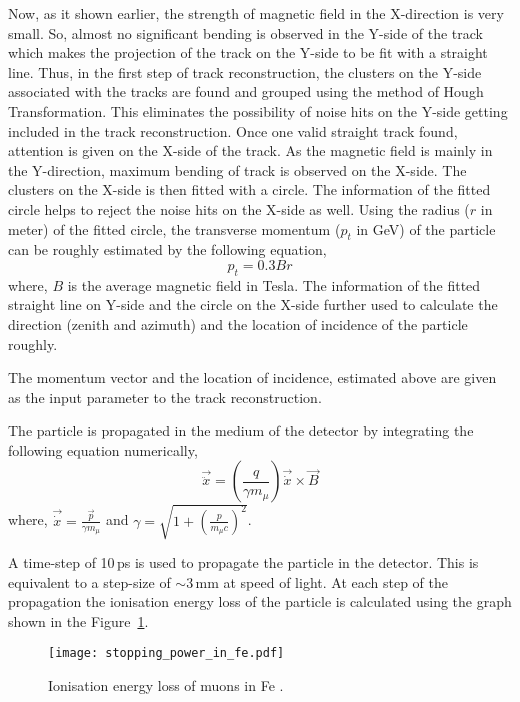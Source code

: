 Now, as it shown earlier, the strength of magnetic field in the
X-direction is very small. So, almost no significant bending is
observed in the Y-side of the track which makes the projection of
the track on the Y-side to be fit with a straight line.
Thus, in the first step of track reconstruction, the clusters on
the Y-side associated with the tracks are found and grouped using
the method of Hough Transformation\cite{hought}. This eliminates
the possibility of noise hits on the Y-side getting included in the
track reconstruction. Once one valid straight track found, attention
is given on the X-side of the track. As the magnetic field is mainly
in the Y-direction, maximum bending of track is observed on the X-side.
The clusters on the X-side is then fitted with a circle.
The information of the fitted circle helps to reject the noise hits
on the X-side as well.
Using the radius ($r$ in meter) of the fitted circle, the transverse
momentum ($p_t$ in GeV) of the particle can be roughly estimated by
the following equation,
\begin{equation}
  p_{t}=0.3Br \label{eq:pt_est}
\end{equation}
where, $B$ is the average magnetic field in Tesla.
The information of the fitted straight line on Y-side and the circle
on the X-side further used to calculate the direction (zenith and
azimuth) and the location of incidence of the particle roughly.

The momentum vector and the location of incidence, estimated
above are given as the input parameter to the track reconstruction.

The particle is propagated in the medium of the detector by integrating
the following equation numerically,
\begin{equation}
  \vec{\ddot{x}} = \left(\frac{q}{\gamma m_{\mu}}\right)\vec{\dot{x}}\times \vec{B}
\end{equation}
where, $\vec{\dot{x}}=\frac{\vec{p}}{\gamma m_{\mu}}$ and
$\gamma=\sqrt{1+\left(\frac{p}{m_{\mu}c}\right)^{2}}$.

A time-step of 10\,ps is used to propagate the particle in the
detector. This is equivalent to a step-size of $\sim$3\,mm at speed
of light. At each step of the propagation the ionisation energy
loss of the particle is calculated using the graph shown in
the Figure~\ref{fig:eloss}.
\begin{figure}[h]
  \centering
  \texttt{[image: stopping\_power\_in\_fe.pdf]}
  \caption{Ionisation energy loss of muons in Fe \cite{pdgspectra1}.}
  \label{fig:eloss}
\end{figure}

